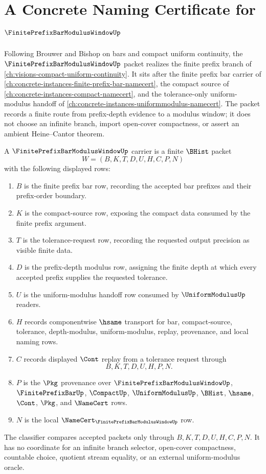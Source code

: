 \chapter{A Concrete Naming Certificate for $\FinitePrefixBarModulusWindowUp$}
\label{ch:concrete-instances-finite-prefix-bar-modulus-window-namecert}

Following Brouwer and Bishop on bars and compact uniform continuity, the $\FinitePrefixBarModulusWindowUp$ packet realizes the finite prefix branch of \autoref{ch:visions-compact-uniform-continuity}. It sits after the finite prefix bar carrier of \autoref{ch:concrete-instances-finite-prefix-bar-namecert}, the compact source of \autoref{ch:concrete-instances-compact-namecert}, and the tolerance-only uniform-modulus handoff of \autoref{ch:concrete-instances-uniformmodulus-namecert}. The packet records a finite route from prefix-depth evidence to a modulus window; it does not choose an infinite branch, import open-cover compactness, or assert an ambient Heine--Cantor theorem.

\begin{definition}
\label{def:finite-prefix-bar-modulus-window-carrier}
A $\FinitePrefixBarModulusWindowUp$ carrier is a finite $\BHist$ packet
$$
W=(B,K,T,D,U,H,C,P,N)
$$
with the following displayed rows:
\begin{enumerate}
\item $B$ is the finite prefix bar row, recording the accepted bar prefixes and their prefix-order boundary.
\item $K$ is the compact-source row, exposing the compact data consumed by the finite prefix argument.
\item $T$ is the tolerance-request row, recording the requested output precision as visible finite data.
\item $D$ is the prefix-depth modulus row, assigning the finite depth at which every accepted prefix supplies the requested tolerance.
\item $U$ is the uniform-modulus handoff row consumed by $\UniformModulusUp$ readers.
\item $H$ records componentwise $\hsame$ transport for bar, compact-source, tolerance, depth-modulus, uniform-modulus, replay, provenance, and local naming rows.
\item $C$ records displayed $\Cont$ replay from a tolerance request through
$$
B,K,T,D,U,H,P,N .
$$
\item $P$ is the $\Pkg$ provenance over $\FinitePrefixBarModulusWindowUp$, $\FinitePrefixBarUp$, $\CompactUp$, $\UniformModulusUp$, $\BHist$, $\hsame$, $\Cont$, $\Pkg$, and $\NameCert$ rows.
\item $N$ is the local $\NameCert_{\FinitePrefixBarModulusWindowUp}$ row.
\end{enumerate}
The classifier compares accepted packets only through $B,K,T,D,U,H,C,P,N$. It has no coordinate for an infinite branch selector, open-cover compactness, countable choice, quotient stream equality, or an external uniform-modulus oracle.
\end{definition}

